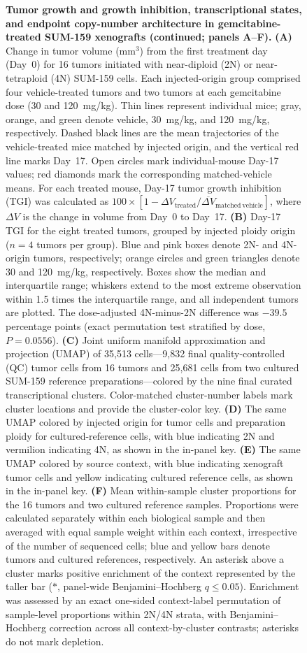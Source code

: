 \documentclass[11pt,notitlepage]{article}
\begin{document}
\begin{figure}[p]
\ContinuedFloat
\captionsetup{list=off,singlelinecheck=false}
\caption{\footnotesize
\textbf{Tumor growth and growth inhibition, transcriptional states, and endpoint copy-number architecture in gemcitabine-treated SUM-159 xenografts (continued; panels A--F).}
\textbf{(A)} Change in tumor volume (mm\(^3\)) from the first treatment day (Day~0) for 16 tumors initiated with near-diploid (2N) or near-tetraploid (4N) SUM-159 cells. Each injected-origin group comprised four vehicle-treated tumors and two tumors at each gemcitabine dose (30 and 120~mg/kg). Thin lines represent individual mice; gray, orange, and green denote vehicle, 30~mg/kg, and 120~mg/kg, respectively. Dashed black lines are the mean trajectories of the vehicle-treated mice matched by injected origin, and the vertical red line marks Day~17. Open circles mark individual-mouse Day-17 values; red diamonds mark the corresponding matched-vehicle means. For each treated mouse, Day-17 tumor growth inhibition (TGI) was calculated as \(100\times[1-\Delta V_{\mathrm{treated}}/\overline{\Delta V}_{\mathrm{matched\ vehicle}}]\), where \(\Delta V\) is the change in volume from Day~0 to Day~17.
\textbf{(B)} Day-17 TGI for the eight treated tumors, grouped by injected ploidy origin (\(n=4\) tumors per group). Blue and pink boxes denote 2N- and 4N-origin tumors, respectively; orange circles and green triangles denote 30 and 120~mg/kg, respectively. Boxes show the median and interquartile range; whiskers extend to the most extreme observation within 1.5 times the interquartile range, and all independent tumors are plotted. The dose-adjusted 4N-minus-2N difference was \(-39.5\) percentage points (exact permutation test stratified by dose, \(P=0.0556\)).
\textbf{(C)} Joint uniform manifold approximation and projection (UMAP) of 35,513 cells---9,832 final quality-controlled (QC) tumor cells from 16 tumors and 25,681 cells from two cultured SUM-159 reference preparations---colored by the nine final curated transcriptional clusters. Color-matched cluster-number labels mark cluster locations and provide the cluster-color key.
\textbf{(D)} The same UMAP colored by injected origin for tumor cells and preparation ploidy for cultured-reference cells, with blue indicating 2N and vermilion indicating 4N, as shown in the in-panel key.
\textbf{(E)} The same UMAP colored by source context, with blue indicating xenograft tumor cells and yellow indicating cultured reference cells, as shown in the in-panel key.
\textbf{(F)} Mean within-sample cluster proportions for the 16 tumors and two cultured reference samples. Proportions were calculated separately within each biological sample and then averaged with equal sample weight within each context, irrespective of the number of sequenced cells; blue and yellow bars denote tumors and cultured references, respectively. An asterisk above a cluster marks positive enrichment of the context represented by the taller bar (\(*\), panel-wide Benjamini--Hochberg \(q\leq0.05\)). Enrichment was assessed by an exact one-sided context-label permutation of sample-level proportions within 2N/4N strata, with Benjamini--Hochberg correction across all context-by-cluster contrasts; asterisks do not mark depletion.
}
\end{figure}
\end{document}
